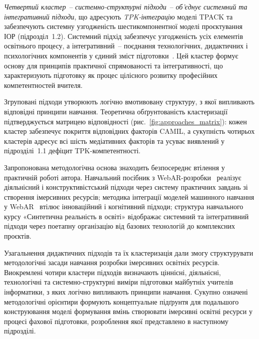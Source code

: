 \emph{Четвертий кластер}~-- \emph{системно-структурні підходи}~-- \emph{об'єднує системний та інтегративний підходи}, що адресують \emph{TPK-інтеграцію} моделі TPACK та забезпечують системну узгодженість шестикомпонентної моделі проєктування ІОР (підрозділ~1.2). Системний підхід забезпечує узгодженість усіх елементів освітнього процесу, а інтегративний~-- поєднання технологічних, дидактичних і психологічних компонентів у єдиний зміст підготовки~\cite{Schmidt2024EntangledLXD}. Цей кластер формує основу для принципів практичної спрямованості та інтегративності, що характеризують підготовку як процес цілісного розвитку професійних компетентностей вчителя.

Згруповані підходи утворюють логічно вмотивовану структуру, з якої випливають відповідні принципи навчання. Теоретична обґрунтованість кластеризації підтверджується матрицею відповідності (рис.~\ref{fig:approaches_matrix}): кожен кластер забезпечує покриття відповідних факторів CAMIL, а сукупність чотирьох кластерів адресує всі шість медіативних факторів та усуває виявлений у підрозділі~1.1 дефіцит TPK-компетентності.

Запропонована методологічна основа знаходить безпосереднє втілення у практичній роботі автора. Навчальний посібник з WebAR-розробки~\cite{Shepiliev2020WebAR,Shepiliev2021Career} реалізує діяльнісний і конструктивістський підходи через систему практичних завдань зі створення імерсивних ресурсів; методика інтеграції моделей машинного навчання у WebAR~\cite{Semerikov2024WebARML_CoSinE} втілює інноваційний і когнітивний підходи; структура навчального курсу «Синтетична реальність в освіті» відображає системний та інтегративний підходи через поетапну організацію від базових технологій до комплексних проєктів.

Узагальнення дидактичних підходів та їх кластеризація дали змогу структурувати методологічні засади навчання розробки імерсивних освітніх ресурсів. Виокремлені чотири кластери підходів визначають ціннісні, діяльнісні, технологічні та системно-структурні виміри підготовки майбутніх учителів інформатики, з яких логічно випливають принципи навчання. Сукупно означені методологічні орієнтири формують концептуальне підґрунтя для подальшого конструювання моделі формування вмінь створювати імерсивні освітні ресурси у процесі фахової підготовки, розроблення якої представлено в наступному підрозділі.

